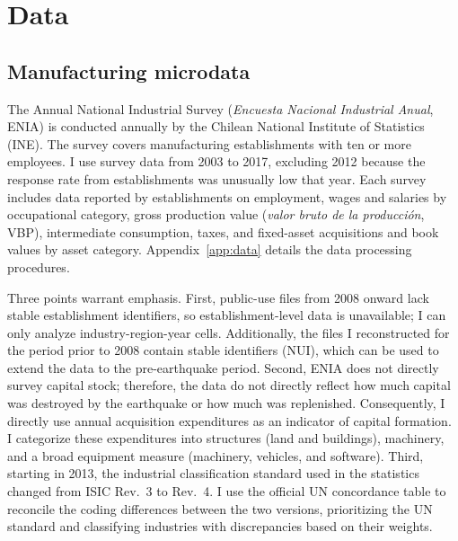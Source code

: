 \documentclass[12pt]{article}
\begin{document}
\FloatBarrier
\section{Data}\label{sec:data}

\subsection{Manufacturing microdata}
The Annual National Industrial Survey (\textit{Encuesta Nacional Industrial Anual}, ENIA) is
conducted annually by the Chilean National Institute of Statistics (INE). The survey covers
manufacturing establishments with ten or more employees. I use survey data from 2003 to 2017,
excluding 2012 because the response rate from establishments was unusually low that year. Each
survey includes data reported by establishments on employment, wages and salaries by occupational
category, gross production value (\textit{valor bruto de la producci\'on}, VBP), intermediate
consumption, taxes, and fixed-asset acquisitions and book values by asset category.
Appendix~\ref{app:data} details the data processing procedures.

Three points warrant emphasis. First, public-use files from 2008 onward lack stable establishment
identifiers, so establishment-level data is unavailable; I can only analyze industry-region-year
cells. Additionally, the files I reconstructed for the period prior to 2008 contain stable
identifiers (NUI), which can be used to extend the data to the pre-earthquake period. Second, ENIA
does not directly survey capital stock; therefore, the data do not directly reflect how much capital
was destroyed by the earthquake or how much was replenished. Consequently, I directly use annual
acquisition expenditures as an indicator of capital formation. I categorize these expenditures into
structures (land and buildings), machinery, and a broad equipment measure (machinery, vehicles, and
software). Third, starting in 2013, the industrial classification standard used in the statistics
changed from ISIC Rev.\ 3 to Rev.\ 4. I use the official UN concordance table to reconcile the coding
differences between the two versions, prioritizing the UN standard and classifying industries with
discrepancies based on their weights.
\end{document}
